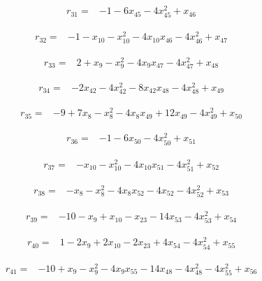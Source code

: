 \documentclass[10pt,letterpaper]{article}
\theoremstyle{remark}\newtheorem{remark}[theorem]{Remark}
\begin{document}
\begin{align*}
r_{31}={}&-1-6x_{45}-4x_{45}^{2}+x_{46}
\end{align*}

\begin{align*}
r_{32}={}&-1-x_{10}-x_{10}^{2}-4x_{10}x_{46}-4x_{46}^{2}+x_{47}
\end{align*}

\begin{align*}
r_{33}={}&2+x_{9}-x_{9}^{2}-4x_{9}x_{47}-4x_{47}^{2}+x_{48}
\end{align*}

\begin{align*}
r_{34}={}&-2x_{42}-4x_{42}^{2}-8x_{42}x_{48}-4x_{48}^{2}+x_{49}
\end{align*}

\begin{align*}
r_{35}={}&-9+7x_{8}-x_{8}^{2}-4x_{8}x_{49}+12x_{49}-4x_{49}^{2}+x_{50}
\end{align*}

\begin{align*}
r_{36}={}&-1-6x_{50}-4x_{50}^{2}+x_{51}
\end{align*}

\begin{align*}
r_{37}={}&-x_{10}-x_{10}^{2}-4x_{10}x_{51}-4x_{51}^{2}+x_{52}
\end{align*}

\begin{align*}
r_{38}={}&-x_{8}-x_{8}^{2}-4x_{8}x_{52}-4x_{52}-4x_{52}^{2}+x_{53}
\end{align*}

\begin{align*}
r_{39}={}&-10-x_{9}+x_{10}-x_{23}-14x_{53}-4x_{53}^{2}+x_{54}
\end{align*}

\begin{align*}
r_{40}={}&1-2x_{9}+2x_{10}-2x_{23}+4x_{54}-4x_{54}^{2}+x_{55}
\end{align*}

\begin{align*}
r_{41}={}&-10+x_{9}-x_{9}^{2}-4x_{9}x_{55}-14x_{48}-4x_{48}^{2}-4x_{55}^{2}+x_{56}
\end{align*}
\end{document}
